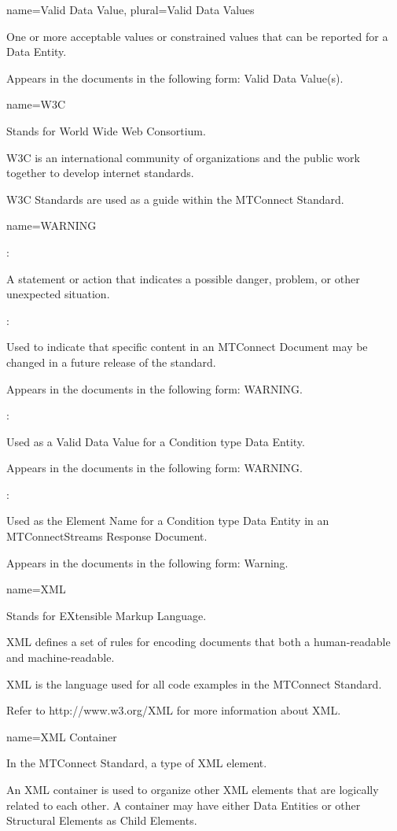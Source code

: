 {
  name={Valid Data Value},
  plural={Valid Data Values}
}
{
	One or more acceptable values or constrained values that can be reported for a Data Entity.

	Appears in the documents in the following form: Valid Data Value(s).
}


{
  name={W3C}
}
{
	Stands for World Wide Web Consortium.

	W3C is an international community of organizations and the public work together to develop internet standards.  

	W3C Standards are used as a guide within the MTConnect Standard.
}


{
  name={WARNING}
}
{
	:

	A statement or action that indicates a possible danger, problem, or other unexpected situation.

	:

	Used to indicate that specific content in an MTConnect Document may be changed in a future release of the standard.

	Appears in the documents in the following form: WARNING.

	:

	Used as a Valid Data Value for a Condition type Data Entity.

	Appears in the documents in the following form: WARNING.

	:

	Used as the Element Name for a Condition type Data Entity in an MTConnectStreams Response Document.

	Appears in the documents in the following form: Warning.
}


{
  name={XML}
}
{
	Stands for EXtensible Markup Language. 

	XML defines a set of rules for encoding documents that both a human-readable and machine-readable.

	XML is the language used for all code examples in the MTConnect Standard.

	Refer to http://www.w3.org/XML for more information about XML.
}


{
  name={XML Container}
}
{
	In the MTConnect Standard, a type of XML element.

	An XML container is used to organize other XML elements that are logically related to each other.   A container may have either Data Entities or other Structural Elements as Child Elements.
}


